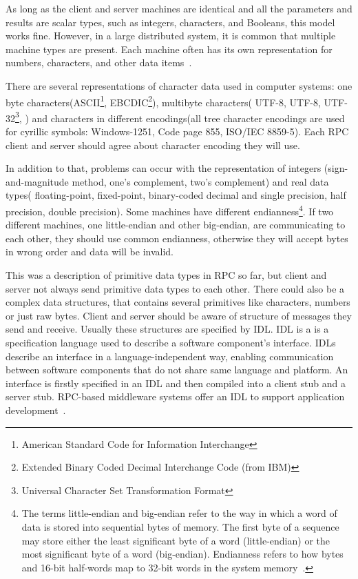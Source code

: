As long as the client and server machines are identical and all the parameters
and results are scalar types, such as integers, characters, and Booleans, this model
works fine. 
However, in a large distributed system, it is common that multiple
machine types are present.
Each machine often has its own representation for
numbers, characters, and other data items~\cite{tanenbaum07}.

There are several representations of character data used in computer systems:
one byte characters(ASCII\footnote{ American Standard Code for Information
Interchange}, EBCDIC\footnote{Extended Binary Coded Decimal Interchange Code
(from IBM)}), multibyte characters( UTF-8, UTF-8, UTF-32\footnote{Universal
Character Set Transformation Format},  ) and characters in different
encodings(all tree character encodings are used for cyrillic symbols: 
Windows-1251, Code page 855, ISO/IEC 8859-5). Each RPC client and server should
agree about character encoding they will use.

In addition to that, problems can occur with the representation of integers
(sign-and-magnitude method, one’s complement, two’s complement) and
real data types( floating-point, fixed-point, binary-coded decimal and single
precision, half precision, double precision). Some machines have different
endianness\footnote{The terms little-endian and big-endian refer to the way in which a word of data is stored into sequential bytes of
memory. The first byte of a sequence may store either the least significant byte of a word (little-endian) or the most
significant byte of a word (big-endian). Endianness refers to how bytes and
16-bit half-words map to 32-bit words in the system memory~\cite{arm_endian}.}.
If two different machines, one little-endian and other big-endian, are
communicating to each other, they should use common endianness, otherwise they
will accept bytes in wrong order and data will be invalid.

This was a description of primitive data types in RPC so far, but client and
server not always send primitive data types to each other. There could also be a
complex data structures, that contains several primitives like characters,
numbers or just raw bytes. Client and server should be aware of structure of
messages they send and receive. Usually these structures are specified by
\gls{IDL}.
IDL is a  is a specification language used to describe a software component's interface.
IDLs describe an interface in a language-independent way, enabling
communication between software components that do not share same language and
platform.
An interface is firstly specified in an IDL and then compiled into a
client stub and a server stub. RPC-based middleware systems
offer an IDL to support application development~\cite{tanenbaum07}.

